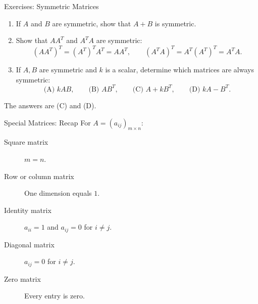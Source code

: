 \begin{frame}[shrink=7]{Exercises: Symmetric Matrices}
\begin{enumerate}
  \item If $A$ and $B$ are symmetric, show that $A+B$ is symmetric.
  \item Show that $AA^T$ and $A^TA$ are symmetric:
  \[
  (AA^T)^T=(A^T)^TA^T=AA^T,
  \qquad
  (A^TA)^T=A^T(A^T)^T=A^TA.
  \]
  \item If $A,B$ are symmetric and $k$ is a scalar, determine which matrices are always symmetric:
  \[
  \text{(A) }kAB,\qquad
  \text{(B) }AB^T,\qquad
  \text{(C) }A+kB^T,\qquad
  \text{(D) }kA-B^T.
  \]
\end{enumerate}\pause
The answers are (C) and (D).
\end{frame}


\begin{frame}{Special Matrices: Recap}
For $A=(a_{ij})_{m\times n}$:
\begin{description}
  \item[Square matrix] $m=n$.
  \item[Row or column matrix] One dimension equals $1$.
  \item[Identity matrix] $a_{ii}=1$ and $a_{ij}=0$ for $i\ne j$.
  \item[Diagonal matrix] $a_{ij}=0$ for $i\ne j$.
  \item[Zero matrix] Every entry is zero.
\end{description}
\end{frame}

